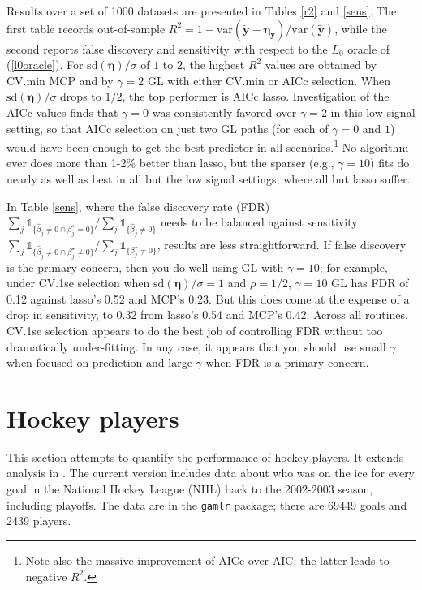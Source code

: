 \documentclass[12pt]{article}
\newcommand{\bs}[1]{\boldsymbol{#1}}
\newcommand{\mr}[1]{\mathrm{#1}}
\newcommand{\bm}[1]{\mathbf{#1}}
\newcommand{\ds}[1]{\mathds{#1}}
\begin{document}
Results over a set of 1000 datasets are presented in Tables \ref{r2} and
\ref{sens}.  The first table records out-of-sample $R^2 = 1 -
\mr{var}(\bm{\tilde y} - \bs{\eta}_\bm{y})/\mr{var}(\bm{\tilde y})$, while the
second reports false discovery and sensitivity with respect to the $L_0$
oracle of (\ref{l0oracle}).  For $\mr{sd}(\bm{\eta})/\sigma$ of $1$ to $2$,
the highest $R^2$ values are obtained by CV.min  MCP and  by $\gamma=2$  GL
with either CV.min or AICc selection. When $\mr{sd}(\bm{\eta})/\sigma$ drops
to $1/2$, the top performer is AICc lasso. Investigation of the AICc values
finds that $\gamma=0$ was consistently favored over $\gamma=2$ in this low
signal setting, so that AICc selection on just two GL paths (for each of
$\gamma=0$ and $1$) would have been enough to get the best predictor in all
scenarios.\footnote{Note also the massive improvement of AICc over AIC: the
latter leads to negative $R^2$.} No algorithm ever does more than 1-2\% better
than lasso, but the sparser (e.g., $\gamma=10$) fits do nearly as
well as best in all but the low signal settings, where all but lasso suffer.

In Table \ref{sens}, where the false
discovery rate (FDR) $\sum_j\ds{1}_{\{\hat\beta_j \neq 0 \cap
\beta^\star_j=0\}}/\sum_j\ds{1}_{\{\hat\beta_j \neq 0\}}$ needs to be balanced
against sensitivity $\sum_j\ds{1}_{\{\hat\beta_j \neq 0 \cap \beta^\star_j
\neq 0\}}/\sum_j\ds{1}_{\{\beta^\star_j \neq 0\}}$, results are less
straightforward.  If false discovery is the primary concern, then you do well
using GL with $\gamma=10$; for example, under CV.1se selection when
$\mr{sd}(\bm{\eta})/\sigma=1$ and $\rho=1/2$, $\gamma=10$ GL has FDR of 0.12
against lasso's 0.52 and MCP's 0.23.  But this does come at the expense of a
drop in sensitivity, to 0.32 from lasso's 0.54 and MCP's 0.42. Across all
routines,  CV.1se selection  appears to do the best job of controlling
FDR without too dramatically under-fitting.  In any case, it appears that you
should use small $\gamma$ when focused on prediction and large $\gamma$ when
FDR is a primary concern.


\section{Hockey players}
\label{nhl}


This section attempts to quantify the
performance of hockey players.  It extends  analysis in
\cite{gramacy_estimating_2013}.  The current version includes data about who
was on the ice for every goal in the National Hockey League (NHL) back to the
2002-2003 season, including playoffs.  The data
are in the {\tt gamlr} package; there are
69449 goals and 2439 players.
\end{document}
